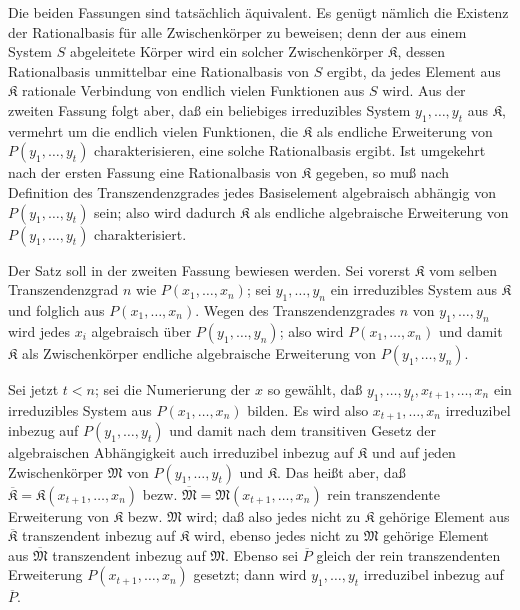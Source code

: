 \documentclass[11pt]{article}
\begin{document}
Die beiden Fassungen sind tatsächlich äquivalent. Es genügt nämlich die Existenz der Rationalbasis für alle Zwischenkörper zu beweisen; denn der aus einem System $S$ abgeleitete Körper wird ein solcher Zwischenkörper $\mathfrak K$, dessen Rationalbasis unmittelbar eine Rationalbasis von $S$ ergibt, da jedes Element aus $\mathfrak K$ rationale Verbindung von endlich vielen Funktionen aus $S$ wird. Aus der zweiten Fassung folgt aber, daß ein beliebiges irreduzibles System $y_1,\ldots,y_t$ aus $\mathfrak K$, vermehrt um die endlich vielen Funktionen, die $\mathfrak K$ als endliche Erweiterung von $P(y_1,\ldots,y_t)$ charakterisieren, eine solche Rationalbasis ergibt. Ist umgekehrt nach der ersten Fassung eine Rationalbasis von $\mathfrak K$ gegeben, so muß nach Definition des Transzendenzgrades jedes Basiselement algebraisch abhängig von $P(y_1,\ldots,y_t)$ sein; also wird dadurch $\mathfrak K$ als endliche algebraische Erweiterung von $P(y_1,\ldots,y_t)$ charakterisiert.

Der Satz soll in der zweiten Fassung bewiesen werden. Sei vorerst $\mathfrak K$ vom selben Transzendenzgrad $n$ wie $P(x_1,\ldots,x_n)$; sei $y_1,\ldots,y_n$ ein irreduzibles System aus $\mathfrak K$ und folglich aus $P(x_1,\ldots,x_n)$. Wegen des Transzendenzgrades $n$ von $y_1,\ldots,y_n$ wird jedes $x_i$ algebraisch über $P(y_1,\ldots,y_n)$; also wird $P(x_1,\ldots,x_n)$ und damit $\mathfrak K$ als Zwischenkörper endliche algebraische Erweiterung von $P(y_1,\ldots,y_n)$.

Sei jetzt $t<n$; sei die Numerierung der $x$ so gewählt, daß $y_1,\ldots,y_t,x_{t+1},\ldots,x_n$ ein irreduzibles System aus $P(x_1,\ldots,x_n)$ bilden. Es wird also $x_{t+1},\ldots,x_n$ irreduzibel inbezug auf $P(y_1,\ldots,y_t)$ und damit nach dem transitiven Gesetz der algebraischen Abhängigkeit auch irreduzibel inbezug auf $\mathfrak K$ und auf jeden Zwischenkörper $\mathfrak M$ von $P(y_1,\ldots,y_t)$ und $\mathfrak K$. Das heißt aber, daß $\overline{\mathfrak K}=\mathfrak K(x_{t+1},\ldots,x_n)$ bezw. $\overline{\mathfrak M}=\mathfrak M(x_{t+1},\ldots,x_n)$ rein transzendente Erweiterung von $\mathfrak K$ bezw. $\mathfrak M$ wird; daß also jedes nicht zu $\mathfrak K$ gehörige Element aus $\overline{\mathfrak K}$ transzendent inbezug auf $\mathfrak K$ wird, ebenso jedes nicht zu $\mathfrak M$ gehörige Element aus $\overline{\mathfrak M}$ transzendent inbezug auf $\mathfrak M$. Ebenso sei $\overline P$ gleich der rein transzendenten Erweiterung $P(x_{t+1},\ldots,x_n)$ gesetzt; dann wird $y_1,\ldots,y_t$ irreduzibel inbezug auf $\overline P$.
\end{document}
